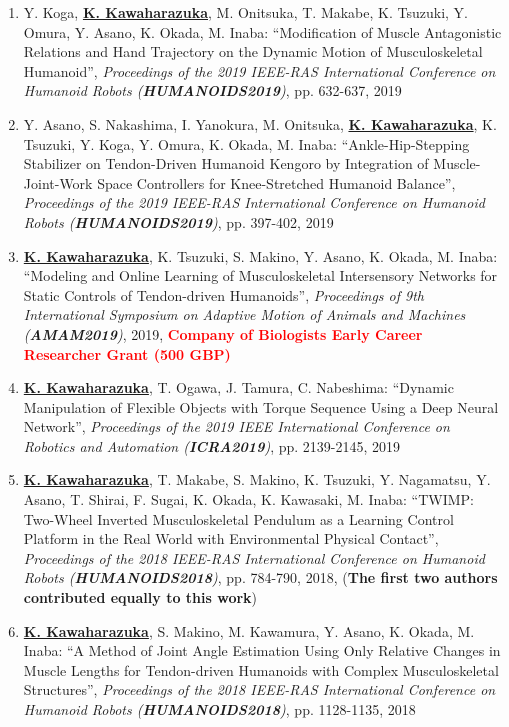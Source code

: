 \documentclass[letterpaper]{article}
\begin{document}
\begin{enumerate}
\item Y. Koga, \underline{\textbf{K. Kawaharazuka}}, M. Onitsuka, T. Makabe, K. Tsuzuki, Y. Omura, Y. Asano, K. Okada, M. Inaba: ``Modification of Muscle Antagonistic Relations and Hand Trajectory on the Dynamic Motion of Musculoskeletal Humanoid'', \textit{Proceedings of the 2019 IEEE-RAS International Conference on Humanoid Robots (\textit{\textbf{HUMANOIDS2019}})}, pp. 632-637, 2019
\item Y. Asano, S. Nakashima, I. Yanokura, M. Onitsuka, \underline{\textbf{K. Kawaharazuka}}, K. Tsuzuki, Y. Koga, Y. Omura, K. Okada, M. Inaba: ``Ankle-Hip-Stepping Stabilizer on Tendon-Driven Humanoid Kengoro by Integration of Muscle-Joint-Work Space Controllers for Knee-Stretched Humanoid Balance'', \textit{Proceedings of the 2019 IEEE-RAS International Conference on Humanoid Robots (\textit{\textbf{HUMANOIDS2019}})}, pp. 397-402, 2019
\item \underline{\textbf{K. Kawaharazuka}}, K. Tsuzuki, S. Makino, Y. Asano, K. Okada, M. Inaba: ``Modeling and Online Learning of Musculoskeletal Intersensory Networks for Static Controls of Tendon-driven Humanoids'', \textit{Proceedings of 9th International Symposium on Adaptive Motion of Animals and Machines (\textit{\textbf{AMAM2019}})}, 2019, \textbf{\textcolor{red}{Company of Biologists Early Career Researcher Grant (500 GBP)}}
\item \underline{\textbf{K. Kawaharazuka}}, T. Ogawa, J. Tamura, C. Nabeshima: ``Dynamic Manipulation of Flexible Objects with Torque Sequence Using a Deep Neural Network'', \textit{Proceedings of the 2019 IEEE International Conference on Robotics and Automation (\textit{\textbf{ICRA2019}})}, pp. 2139-2145, 2019
\item \underline{\textbf{K. Kawaharazuka}}, T. Makabe, S. Makino, K. Tsuzuki, Y. Nagamatsu, Y. Asano, T. Shirai, F. Sugai, K. Okada, K. Kawasaki, M. Inaba: ``TWIMP: Two-Wheel Inverted Musculoskeletal Pendulum as a Learning Control Platform in the Real World with Environmental Physical Contact'', \textit{Proceedings of the 2018 IEEE-RAS International Conference on Humanoid Robots (\textit{\textbf{HUMANOIDS2018}})}, pp. 784-790, 2018, (\textbf{The first two authors contributed equally to this work})
\item \underline{\textbf{K. Kawaharazuka}}, S. Makino, M. Kawamura, Y. Asano, K. Okada, M. Inaba: ``A Method of Joint Angle Estimation Using Only Relative Changes in Muscle Lengths for Tendon-driven Humanoids with Complex Musculoskeletal Structures'', \textit{Proceedings of the 2018 IEEE-RAS International Conference on Humanoid Robots (\textit{\textbf{HUMANOIDS2018}})}, pp. 1128-1135, 2018

\end{enumerate}
\end{document}
